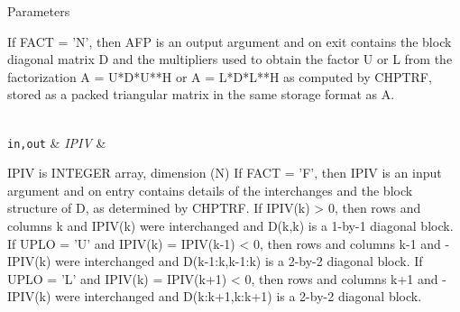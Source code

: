\begin{DoxyParams}[1]{Parameters}
\begin{DoxyVerb}
          If FACT = 'N', then AFP is an output argument and on exit
          contains the block diagonal matrix D and the multipliers used
          to obtain the factor U or L from the factorization
          A = U*D*U**H or A = L*D*L**H as computed by CHPTRF, stored as
          a packed triangular matrix in the same storage format as A.\end{DoxyVerb}
\\
\hline
\mbox{\tt in,out}  & {\em I\+P\+I\+V} & \begin{DoxyVerb}          IPIV is INTEGER array, dimension (N)
          If FACT = 'F', then IPIV is an input argument and on entry
          contains details of the interchanges and the block structure
          of D, as determined by CHPTRF.
          If IPIV(k) > 0, then rows and columns k and IPIV(k) were
          interchanged and D(k,k) is a 1-by-1 diagonal block.
          If UPLO = 'U' and IPIV(k) = IPIV(k-1) < 0, then rows and
          columns k-1 and -IPIV(k) were interchanged and D(k-1:k,k-1:k)
          is a 2-by-2 diagonal block.  If UPLO = 'L' and IPIV(k) =
          IPIV(k+1) < 0, then rows and columns k+1 and -IPIV(k) were
          interchanged and D(k:k+1,k:k+1) is a 2-by-2 diagonal block.


\end{DoxyVerb}
\end{DoxyParams}
